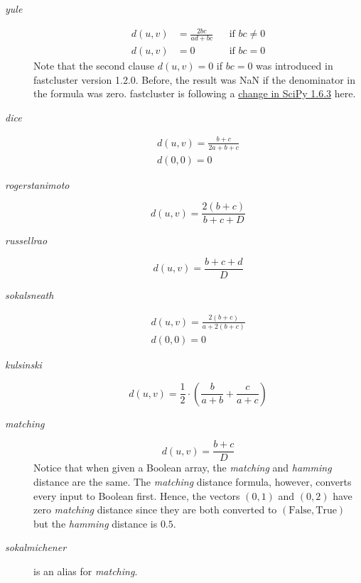 \documentclass[fontsize=10pt,paper=letter,BCOR=-6mm,DIV=8]{scrartcl}
\makeatletter
\newcommand*\q{\textquotesingle}
\newenvironment{methods}{%
  \list{}{\labelwidth\z@
    \itemindent-\leftmargin
    \let\makelabel\methodslabel}%
}{%
  \endlist
}
\newcommand*{\methodslabel}[1]{%
  \hbox to \textwidth{\hspace{\labelsep}%
  \normalfont\bfseries\ttfamily
  #1\hskip-\labelsep\hfill}%
}
\makeatother
\begin{document}
\begin{methods}
\begin{description}
\item[\normalfont\textit{\q yule\q}]
\label{yule}
\begin{align*}
  d(u,v) &= \frac{2bc}{ad+bc} && \text{if $bc \neq 0$}\\
  d(u,v) &= 0 && \text{if $bc = 0$}
\end{align*}
Note that the second clause $d(u,v)=0$ if $bc = 0$ was introduced in fastcluster version 1.2.0. Before, the result was NaN if the denominator in the formula was zero. fastcluster is following a \href{https://github.com/scipy/scipy/commit/3b22d1da98dc1b5f64bc944c21f398d4ba782bce}{change in SciPy 1.6.3} here.

\item[\normalfont\textit{\q dice\q}]
\begin{gather*}
 d(u,v) = \frac{b+c}{2a+b+c}\\
 d(0,0) = 0
\end{gather*}

\item[\normalfont\textit{\q rogerstanimoto\q}]
\[
 d(u,v) = \frac{2(b+c)}{b+c+D}
\]

\item[\normalfont\textit{\q russellrao\q}]
\[
 d(u,v) = \frac{b+c+d}{D}
\]

\item[\normalfont\textit{\q sokalsneath\q}]
\begin{gather*}
 d(u,v) = \frac{2(b+c)}{a+2(b+c)}\\
 d(0,0) = 0
\end{gather*}

\item[\normalfont\textit{\q kulsinski\q}]
\[
 d(u,v) = \frac 12\cdot\left(\frac b{a+b} + \frac c{a+c}\right)
\]

\item[\normalfont\textit{\q matching\q}]
\[
 d(u,v) = \frac{b+c}{D}
\]
Notice that when given a Boolean array, the \textit{matching} and \textit{hamming} distance are the same. The \textit{matching} distance formula, however, converts every input to Boolean first. Hence, the vectors $(0,1)$ and $(0,2)$ have zero \textit{matching} distance since they are both converted to $(\mathrm{False}, \mathrm{True})$ but the \textit{hamming} distance is $0.5$.

\item[\normalfont\textit{\q sokalmichener\q}] is an alias for \textit{\q matching\q}.

\end{description}

\end{methods}
\end{document}
